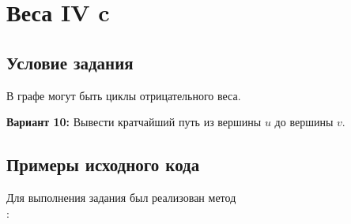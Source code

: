 \section{Веса IV c}
\subsection{Условие задания}
В графе могут быть циклы отрицательного веса.

\textbf{Вариант 10:} Вывести кратчайший путь из вершины $u$ до вершины $v$.

\subsection{Примеры исходного кода}
Для выполнения задания был реализован метод\\
:
